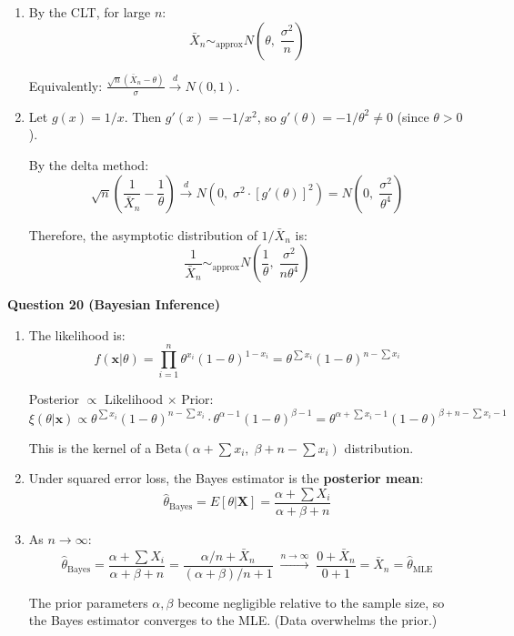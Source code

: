 \documentclass[11pt]{article}
\begin{document}
\begin{enumerate}[label=(\alph*)]
\item By the CLT, for large $n$:
$$\bar X_n \sim_{\text{approx}} N\!\left(\theta,\; \frac{\sigma^2}{n}\right)$$

Equivalently: $\frac{\sqrt{n}(\bar X_n - \theta)}{\sigma} \xrightarrow{d} N(0,1)$.

\item Let $g(x) = 1/x$. Then $g'(x) = -1/x^2$, so $g'(\theta) = -1/\theta^2 \ne 0$ (since $\theta > 0$).

By the delta method:
$$\sqrt{n}\left(\frac{1}{\bar X_n} - \frac{1}{\theta}\right) \xrightarrow{d} N\!\left(0,\; \sigma^2 \cdot [g'(\theta)]^2\right) = N\!\left(0,\; \frac{\sigma^2}{\theta^4}\right)$$

Therefore, the asymptotic distribution of $1/\bar X_n$ is:
$$\boxed{\frac{1}{\bar X_n} \sim_{\text{approx}} N\!\left(\frac{1}{\theta},\; \frac{\sigma^2}{n\theta^4}\right)}$$
\end{enumerate}

\bigskip

\textbf{Question 20 (Bayesian Inference)}

\begin{enumerate}[label=(\alph*)]
\item The likelihood is:
$$f(\mathbf{x}|\theta) = \prod_{i=1}^n \theta^{x_i}(1-\theta)^{1-x_i} = \theta^{\sum x_i}(1-\theta)^{n - \sum x_i}$$

Posterior $\propto$ Likelihood $\times$ Prior:
$$\xi(\theta|\mathbf{x}) \propto \theta^{\sum x_i}(1-\theta)^{n-\sum x_i} \cdot \theta^{\alpha-1}(1-\theta)^{\beta-1} = \theta^{\alpha + \sum x_i - 1}(1-\theta)^{\beta + n - \sum x_i - 1}$$

This is the kernel of a $\boxed{\text{Beta}(\alpha + \textstyle\sum x_i,\; \beta + n - \textstyle\sum x_i)}$ distribution.

\item Under squared error loss, the Bayes estimator is the \textbf{posterior mean}:
$$\hat\theta_{\text{Bayes}} = E[\theta|\mathbf{X}] = \frac{\alpha + \sum X_i}{\alpha + \beta + n}$$

\item As $n \to \infty$:
$$\hat\theta_{\text{Bayes}} = \frac{\alpha + \sum X_i}{\alpha + \beta + n} = \frac{\alpha/n + \bar X_n}{(\alpha + \beta)/n + 1} \;\xrightarrow{n\to\infty}\; \frac{0 + \bar X_n}{0 + 1} = \bar X_n = \hat\theta_{\text{MLE}}$$

The prior parameters $\alpha, \beta$ become negligible relative to the sample size, so the Bayes estimator converges to the MLE. (Data overwhelms the prior.)
\end{enumerate}
\end{document}
